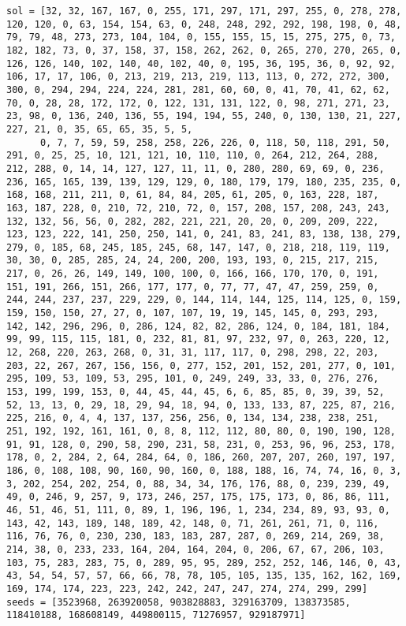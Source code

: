 \begin{lstlisting}[label={lst:call300vehicle90},caption=Optimal solution call\_300\_vehicle\_90]
sol = [32, 32, 167, 167, 0, 255, 171, 297, 171, 297, 255, 0, 278, 278, 120, 120, 0, 63, 154, 154, 63, 0, 248, 248, 292, 292, 198, 198, 0, 48, 79, 79, 48, 273, 273, 104, 104, 0, 155, 155, 15, 15, 275, 275, 0, 73, 182, 182, 73, 0, 37, 158, 37, 158, 262, 262, 0, 265, 270, 270, 265, 0, 126, 126, 140, 102, 140, 40, 102, 40, 0, 195, 36, 195, 36, 0, 92, 92, 106, 17, 17, 106, 0, 213, 219, 213, 219, 113, 113, 0, 272, 272, 300, 300, 0, 294, 294, 224, 224, 281, 281, 60, 60, 0, 41, 70, 41, 62, 62, 70, 0, 28, 28, 172, 172, 0, 122, 131, 131, 122, 0, 98, 271, 271, 23, 23, 98, 0, 136, 240, 136, 55, 194, 194, 55, 240, 0, 130, 130, 21, 227, 227, 21, 0, 35, 65, 65, 35, 5, 5,
      0, 7, 7, 59, 59, 258, 258, 226, 226, 0, 118, 50, 118, 291, 50, 291, 0, 25, 25, 10, 121, 121, 10, 110, 110, 0, 264, 212, 264, 288, 212, 288, 0, 14, 14, 127, 127, 11, 11, 0, 280, 280, 69, 69, 0, 236, 236, 165, 165, 139, 139, 129, 129, 0, 180, 179, 179, 180, 235, 235, 0, 168, 168, 211, 211, 0, 61, 84, 84, 205, 61, 205, 0, 163, 228, 187, 163, 187, 228, 0, 210, 72, 210, 72, 0, 157, 208, 157, 208, 243, 243, 132, 132, 56, 56, 0, 282, 282, 221, 221, 20, 20, 0, 209, 209, 222, 123, 123, 222, 141, 250, 250, 141, 0, 241, 83, 241, 83, 138, 138, 279, 279, 0, 185, 68, 245, 185, 245, 68, 147, 147, 0, 218, 218, 119, 119, 30, 30, 0, 285, 285, 24, 24, 200, 200, 193, 193, 0, 215, 217, 215, 217, 0, 26, 26, 149, 149, 100, 100, 0, 166, 166, 170, 170, 0, 191, 151, 191, 266, 151, 266, 177, 177, 0, 77, 77, 47, 47, 259, 259, 0, 244, 244, 237, 237, 229, 229, 0, 144, 114, 144, 125, 114, 125, 0, 159, 159, 150, 150, 27, 27, 0, 107, 107, 19, 19, 145, 145, 0, 293, 293, 142, 142, 296, 296, 0, 286, 124, 82, 82, 286, 124, 0, 184, 181, 184, 99, 99, 115, 115, 181, 0, 232, 81, 81, 97, 232, 97, 0, 263, 220, 12, 12, 268, 220, 263, 268, 0, 31, 31, 117, 117, 0, 298, 298, 22, 203, 203, 22, 267, 267, 156, 156, 0, 277, 152, 201, 152, 201, 277, 0, 101, 295, 109, 53, 109, 53, 295, 101, 0, 249, 249, 33, 33, 0, 276, 276, 153, 199, 199, 153, 0, 44, 45, 44, 45, 6, 6, 85, 85, 0, 39, 39, 52, 52, 13, 13, 0, 29, 18, 29, 94, 18, 94, 0, 133, 133, 87, 225, 87, 216, 225, 216, 0, 4, 4, 137, 137, 256, 256, 0, 134, 134, 238, 238, 251, 251, 192, 192, 161, 161, 0, 8, 8, 112, 112, 80, 80, 0, 190, 190, 128, 91, 91, 128, 0, 290, 58, 290, 231, 58, 231, 0, 253, 96, 96, 253, 178, 178, 0, 2, 284, 2, 64, 284, 64, 0, 186, 260, 207, 207, 260, 197, 197, 186, 0, 108, 108, 90, 160, 90, 160, 0, 188, 188, 16, 74, 74, 16, 0, 3, 3, 202, 254, 202, 254, 0, 88, 34, 34, 176, 176, 88, 0, 239, 239, 49, 49, 0, 246, 9, 257, 9, 173, 246, 257, 175, 175, 173, 0, 86, 86, 111, 46, 51, 46, 51, 111, 0, 89, 1, 196, 196, 1, 234, 234, 89, 93, 93, 0, 143, 42, 143, 189, 148, 189, 42, 148, 0, 71, 261, 261, 71, 0, 116, 116, 76, 76, 0, 230, 230, 183, 183, 287, 287, 0, 269, 214, 269, 38, 214, 38, 0, 233, 233, 164, 204, 164, 204, 0, 206, 67, 67, 206, 103, 103, 75, 283, 283, 75, 0, 289, 95, 95, 289, 252, 252, 146, 146, 0, 43, 43, 54, 54, 57, 57, 66, 66, 78, 78, 105, 105, 135, 135, 162, 162, 169, 169, 174, 174, 223, 223, 242, 242, 247, 247, 274, 274, 299, 299]
seeds = [3523968, 263920058, 903828883, 329163709, 138373585, 118410188, 168608149, 449800115, 71276957, 929187971]
\end{lstlisting}%
\clearpage


